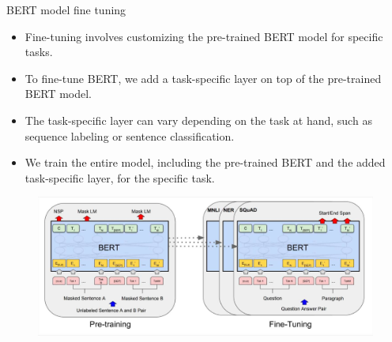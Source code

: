 \documentclass[handout]{beamer}
\begin{document}
\begin{frame}{BERT model fine tuning}
\begin{scriptsize}
\begin{itemize}
\item Fine-tuning involves customizing the pre-trained BERT model for specific tasks.
\item To fine-tune BERT, we add a task-specific layer on top of the pre-trained BERT model.
\item The task-specific layer can vary depending on the task at hand, such as sequence labeling or sentence classification.
\item We train the entire model, including the pre-trained BERT and the added task-specific layer, for the specific task.
\end{itemize}

 \begin{figure}[h]
        	\includegraphics[scale = 0.2]{pics/BERTFineTuning.png}
        \end{figure}  


\end{scriptsize}
\end{frame}
\end{document}
